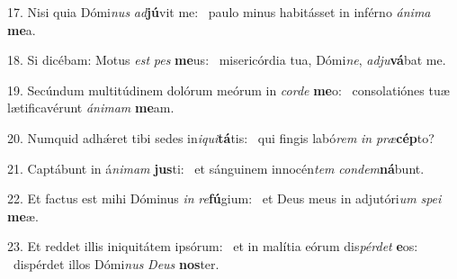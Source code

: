 17. Nisi quia Dómi\textit{nus} \textit{ad}\textbf{jú}vit me: \ast\  paulo minus habitásset in inférno \textit{á}\textit{ni}\textit{ma} \textbf{me}a.\

18. Si dicébam: Motus \textit{est} \textit{pes} \textbf{me}us: \ast\  misericórdia tua, Dómi\textit{ne}, \textit{ad}\textit{ju}\textbf{vá}bat me.\

19. Secúndum multitúdinem dolórum meórum in \textit{cor}\textit{de} \textbf{me}o: \ast\  consolatiónes tuæ lætificavérunt \textit{á}\textit{ni}\textit{mam} \textbf{me}am.\

20. Numquid adhǽret tibi sedes in\textit{i}\textit{qui}\textbf{tá}tis: \ast\  qui fingis labó\textit{rem} \textit{in} \textit{præ}\textbf{cép}to?\

21. Captábunt in á\textit{ni}\textit{mam} \textbf{jus}ti: \ast\  et sánguinem innocén\textit{tem} \textit{con}\textit{dem}\textbf{ná}bunt.\

22. Et factus est mihi Dóminus \textit{in} \textit{re}\textbf{fú}gium: \ast\  et Deus meus in adjutóri\textit{um} \textit{spe}\textit{i} \textbf{me}æ.\

23. Et reddet illis iniquitátem ipsórum: \dag\  et in malítia eórum dis\textit{pér}\textit{det} \textbf{e}os: \ast\  dispérdet illos Dómi\textit{nus} \textit{De}\textit{us} \textbf{nos}ter.\

